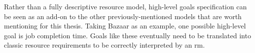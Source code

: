 Rather than a fully descriptive resource model, high-level goals specification can be seen as an add-on to the other previously-mentioned models that are worth mentioning for this thesis.
Taking Bazaar \cite{bazaar} as an example, one possible high-level goal is job completion time.
Goals like these eventually need to be translated into classic resource requirements to be correctly interpreted by an \gls{rm}.